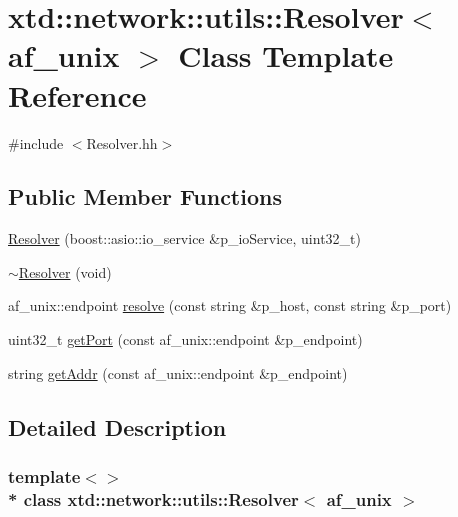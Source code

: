 \hypertarget{classxtd_1_1network_1_1utils_1_1Resolver_3_01af__unix_01_4}{}\section{xtd\+:\+:network\+:\+:utils\+:\+:Resolver$<$ af\+\_\+unix $>$ Class Template Reference}
\label{classxtd_1_1network_1_1utils_1_1Resolver_3_01af__unix_01_4}


{\ttfamily \#include $<$Resolver.\+hh$>$}

\subsection*{Public Member Functions}
\begin{DoxyCompactItemize}
\item 
\hyperlink{classxtd_1_1network_1_1utils_1_1Resolver_3_01af__unix_01_4_a6c22d97efd1096a2b32c3b6b82707685}{Resolver} (boost\+::asio\+::io\+\_\+service \&p\+\_\+io\+Service, uint32\+\_\+t)
\item 
\hyperlink{classxtd_1_1network_1_1utils_1_1Resolver_3_01af__unix_01_4_a4ef41796801ac9b2b223e907512c6937}{$\sim$\+Resolver} (void)
\item 
af\+\_\+unix\+::endpoint \hyperlink{classxtd_1_1network_1_1utils_1_1Resolver_3_01af__unix_01_4_acabb7ae9d31e60d034e46a7f172f3ffb}{resolve} (const string \&p\+\_\+host, const string \&p\+\_\+port)
\item 
uint32\+\_\+t \hyperlink{classxtd_1_1network_1_1utils_1_1Resolver_3_01af__unix_01_4_a75ade0a088898962a4ca8055885dd09d}{get\+Port} (const af\+\_\+unix\+::endpoint \&p\+\_\+endpoint)
\item 
string \hyperlink{classxtd_1_1network_1_1utils_1_1Resolver_3_01af__unix_01_4_ac684f093294b139e46a7e5b89857c7f1}{get\+Addr} (const af\+\_\+unix\+::endpoint \&p\+\_\+endpoint)
\end{DoxyCompactItemize}


\subsection{Detailed Description}
\subsubsection*{template$<$$>$\\*
class xtd\+::network\+::utils\+::\+Resolver$<$ af\+\_\+unix $>$}



